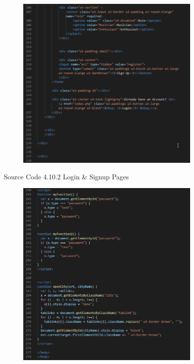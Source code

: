 \begin{enumerate}[1.]
\begin{figure}[h]
\begin{subfigure}[b]{0.7\textwidth}
            \includegraphics[width=\textwidth]{mainmatter/images/frontend/code/loginsignup4.png}
            \label{fig:sub4}
        \end{subfigure}
        \caption*{Source Code 4.10.2 Login \& Signup Pages}
        \label{fig:myfig49b}
    \end{figure}
    \begin{figure}[h]\ContinuedFloat
        \centering
        \begin{subfigure}[b]{0.7\textwidth}
            \centering
            \includegraphics[width=\textwidth]{mainmatter/images/frontend/code/loginsignup5.png}

\end{subfigure}
\end{figure}
\end{enumerate}
